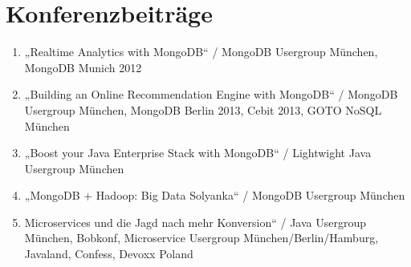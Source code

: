 \section*{Konferenzbeiträge}
\begin{enumerate}[label=,leftmargin=0cm,itemsep=10pt]
\item „Realtime Analytics with MongoDB“ / MongoDB Usergroup München, MongoDB Munich 2012
\item „Building an Online Recommendation Engine with MongoDB“ / MongoDB Usergroup München, MongoDB Berlin 2013, Cebit 2013, GOTO NoSQL München
\item „Boost your Java Enterprise Stack with MongoDB“ / Lightwight Java Usergroup München
\item „MongoDB + Hadoop: Big Data Solyanka“ / MongoDB Usergroup München
\item Microservices und die Jagd nach mehr Konversion“ / Java Usergroup München, Bobkonf, Microservice  Usergroup München/Berlin/Hamburg, Javaland, Confess, Devoxx Poland
\end{enumerate}
